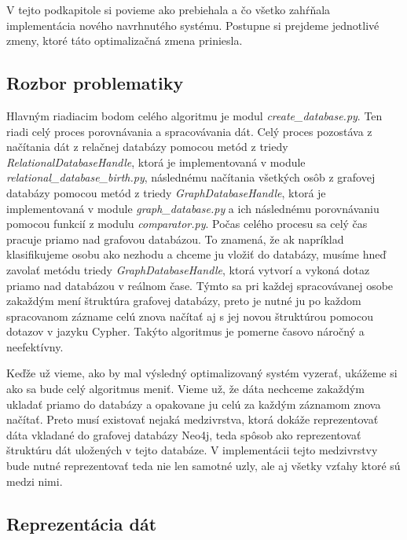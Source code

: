 V tejto podkapitole si povieme ako prebiehala a čo všetko zahŕňala implementácia nového navrhnutého systému. Postupne si prejdeme jednotlivé zmeny, ktoré táto optimalizačná zmena priniesla.

\subsection{Rozbor problematiky}

Hlavným riadiacim bodom celého algoritmu je modul \textit{create\_database.py}. Ten riadi celý proces porovnávania a spracovávania dát. Celý proces pozostáva z načítania dát z relačnej databázy pomocou metód z triedy \textit{RelationalDatabaseHandle}, ktorá je implementovaná v module \textit{relational\_database\_birth.py}, následnému načítania všetkých osôb z grafovej databázy pomocou metód z triedy \textit{GraphDatabaseHandle}, ktorá je implementovaná v module \textit{graph\_database.py} a ich následnému porovnávaniu pomocou funkcií z modulu \textit{comparator.py}. Počas celého procesu sa celý čas pracuje priamo nad grafovou databázou. To znamená, že ak napríklad klasifikujeme osobu ako nezhodu a chceme ju vložiť do databázy, musíme hneď zavolať metódu triedy \textit{GraphDatabaseHandle}, ktorá vytvorí a vykoná dotaz priamo nad databázou v reálnom čase. Týmto sa pri každej spracovávanej osobe zakaždým mení štruktúra grafovej databázy, preto je nutné ju po každom spracovanom zázname celú znova načítať aj s jej novou štruktúrou pomocou dotazov v jazyku Cypher. Takýto algoritmus je pomerne časovo náročný a neefektívny.
\newline

Keďže už vieme, ako by mal výsledný optimalizovaný systém vyzerať, ukážeme si ako sa bude celý algoritmus meniť. Vieme už, že dáta nechceme zakaždým ukladať priamo do databázy a opakovane ju celú za každým záznamom znova načítať. Preto musí existovať nejaká medzivrstva, ktorá dokáže reprezentovať dáta vkladané do grafovej databázy Neo4j, teda spôsob ako reprezentovať štruktúru dát uložených v tejto databáze. V implementácii tejto medzivrstvy bude nutné reprezentovať teda nie len samotné uzly, ale aj všetky vzťahy ktoré sú medzi nimi.

\subsection{Reprezentácia dát}

